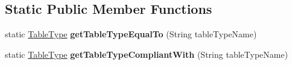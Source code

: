 \subsection*{Static Public Member Functions}
\begin{DoxyCompactItemize}
\item 
\mbox{\label{enumcom_1_1mysql_1_1cj_1_1jdbc_1_1_database_meta_data_1_1_table_type_a391582bd53d82ef2e57ebdb19971e173}} 
static \mbox{\hyperlink{enumcom_1_1mysql_1_1cj_1_1jdbc_1_1_database_meta_data_1_1_table_type}{Table\+Type}} {\bfseries get\+Table\+Type\+Equal\+To} (String table\+Type\+Name)
\item 
\mbox{\label{enumcom_1_1mysql_1_1cj_1_1jdbc_1_1_database_meta_data_1_1_table_type_a2c1b0ce40bf2e762ff2dc94c62642242}} 
static \mbox{\hyperlink{enumcom_1_1mysql_1_1cj_1_1jdbc_1_1_database_meta_data_1_1_table_type}{Table\+Type}} {\bfseries get\+Table\+Type\+Compliant\+With} (String table\+Type\+Name)
\end{DoxyCompactItemize}
